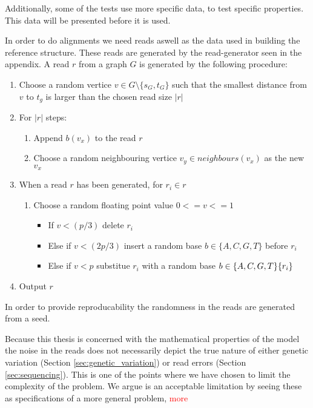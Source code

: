 \documentclass[thesis.tex]{subfiles}
\begin{document}
Additionally, some of the tests use more specific data, to test specific properties. This data will be presented before it is used.
\par\noindent
In order to do alignments we need reads aswell as the data used in building the reference structure. These reads are generated by the read-generator seen in the appendix. A read $r$ from a graph $G$ is generated by the following procedure:
\begin{enumerate}
  \item Choose a random vertice $v \in G\setminus\{s_G, t_G\}$ such that the smallest distance from $v$ to $t_g$ is larger than the chosen read size $|r|$
  \item For $|r|$ steps:
  \begin{enumerate}
    \item Append $b(v_x)$ to the read $r$
    \item Choose a random neighbouring vertice $v_y \in neighbours(v_x)$ as the new $v_x$
  \end{enumerate}
  \item When a read $r$ has been generated, for $r_i \in r$
  \begin{enumerate}
    \item Choose a random floating point value $0<=v<=1$
    \begin{itemize}
      \item If $v<(p/3)$ delete $r_i$
      \item Else if $v<(2p/3)$ insert a random base $b \in \{A, C, G, T\}$ before $r_i$
      \item Else if $v<p$ substitue $r_i$ with a random base $b \in \{A, C, G, T\} \\ \{r_i\}$
    \end{itemize}
  \end{enumerate}
  \item Output $r$
\end{enumerate}
In order to provide reproducability the randomness in the reads are generated from a seed.\\
\par\noindent
Because this thesis is concerned with the mathematical properties of the model the noise in the reads does not necessarily depict the true nature of either genetic variation (Section \ref{sec:genetic_variation}) or read errors (Section \ref{sec:sequencing}). This is one of the points where we have chosen to limit the complexity of the problem. We argue is an acceptable limitation by seeing these as specifications of a more general problem, \textcolor{red}{more}
\end{document}
